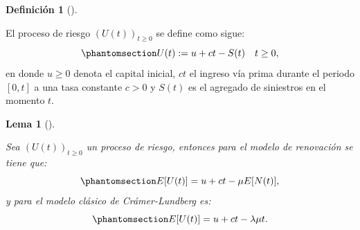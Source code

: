 \documentclass[
  us-letterpaper,
]{scrreprt}
\theoremstyle{plain}
\newtheorem{lemma}{Lema}[chapter]
\theoremstyle{plain}
\theoremstyle{definition}
\newtheorem{definition}{Definición}[chapter]
\theoremstyle{remark}
\begin{document}
\begin{definition}[]\protect\hypertarget{def-3}{}\label{def-3}

El proceso de riesgo \((U(t))_{t \geq 0}\) se define como sigue:
\begin{equation}\phantomsection\label{eq-1.7}{U(t) := u + ct - S(t) \ \ \ t\geq 0, }\end{equation}
en donde \(u \geq 0\) denota el capital inicial, \(ct\) el ingreso vía
prima durante el periodo \([0,t]\) a una tasa constante \(c > 0\) y
\(S(t)\) es el agregado de siniestros en el momento \(t\).

\end{definition}

\begin{lemma}[]\protect\hypertarget{lem-3}{}\label{lem-3}

Sea \((U(t))_{t\geq0}\) un proceso de riesgo, entonces para el modelo de
renovación se tiene que:
\begin{equation}\phantomsection\label{eq-1.10}{E[U(t)] = u + ct - \mu E[N(t)],}\end{equation}
y para el modelo clásico de Crámer-Lundberg es:
\begin{equation}\phantomsection\label{eq-1.11}{E[U(t)] = u + ct - \lambda \mu t.}\end{equation}

\end{lemma}
\end{document}
